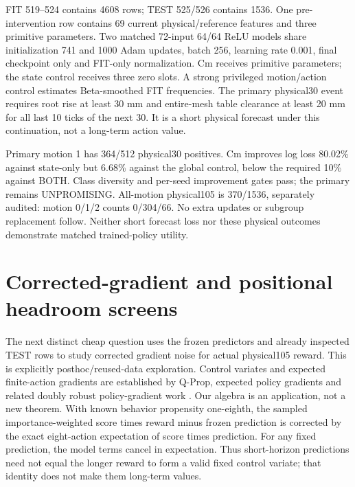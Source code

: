 \documentclass[10 pt]{article}
\begin{document}
FIT 519--524 contains 4608 rows; TEST 525/526 contains 1536. One pre-intervention row
contains 69 current physical/reference features and three primitive parameters.
Two matched 72-input 64/64 ReLU models share initialization 741 and 1000 Adam updates,
batch 256, learning rate 0.001, final checkpoint only and FIT-only normalization.
Cm receives primitive parameters; the state control receives three zero slots.
A strong privileged motion/action control estimates Beta-smoothed FIT frequencies.
The primary physical30 event requires root rise at least 30 mm and entire-mesh
table clearance at least 20 mm for all last 10 ticks of the next 30. It is a short
physical forecast under this continuation, not a long-term action value.

\begin{table}[h]
\centering

\caption{Frozen forecast log losses; smaller is better. Motion 1 is preselected. All-motion results are secondary and do not replace the primary gate.}
\end{table}

Primary motion 1 has 364/512 physical30 positives. Cm improves log loss 80.02\% against
state-only but 6.68\% against the global control, below the required 10\% against BOTH.
Class diversity and per-seed improvement gates pass; the primary remains UNPROMISING.
All-motion physical105 is 370/1536, separately audited: motion 0/1/2 counts 0/304/66.
No extra updates or subgroup replacement follow. Neither short forecast loss nor
these physical outcomes demonstrate matched trained-policy utility.

\section{Corrected-gradient and positional headroom screens}
The next distinct cheap question uses the frozen predictors and already inspected
TEST rows to study corrected gradient noise for actual physical105 reward.
This is explicitly posthoc/reused-data exploration. Control variates and expected
finite-action gradients are established by Q-Prop, expected policy gradients and
related doubly robust policy-gradient work \cite{gu2017,ciosek2020,huang2020}.
Our algebra is an application, not a new theorem. With known behavior propensity
one-eighth, the sampled importance-weighted score times reward minus frozen
prediction is corrected by the exact eight-action expectation of score times
prediction. For any fixed prediction, the model terms cancel in expectation.
Thus short-horizon predictions need not equal the longer reward to form a valid
fixed control variate; that identity does not make them long-term values.
\end{document}
